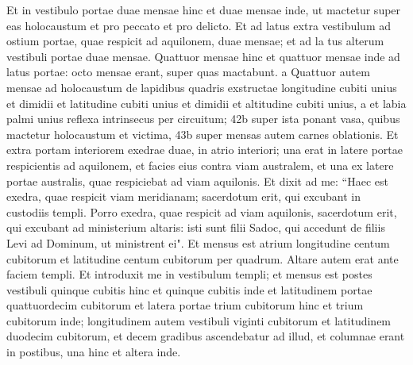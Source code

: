 \begin{biblechapter}
\verse Et in vestibulo portae duae mensae hinc et duae mensae inde, ut mactetur super eas holocaustum et pro peccato et pro delicto. 
\verse Et ad latus extra vestibulum ad ostium portae, quae respicit ad aquilonem, duae mensae; et ad la tus alterum vestibuli portae duae mensae. 
\verse Quattuor mensae hinc et quattuor mensae inde ad latus portae: octo mensae erant, super quas mactabunt.  
\verse a Quattuor autem mensae ad holocaustum de lapidibus quadris exstructae longitudine cubiti unius et dimidii et latitudine cubiti unius et dimidii et altitudine cubiti unius, 
\verse a et labia palmi unius reflexa intrinsecus per circuitum; 42b super ista ponant vasa, quibus mactetur holocaustum et victima,  43b super mensas autem carnes oblationis. 
\verse Et extra portam interiorem exedrae duae, in atrio interiori; una erat in latere portae respicientis ad aquilonem, et facies eius contra viam australem, et una ex latere portae australis, quae respiciebat ad viam aquilonis. 
\verse Et dixit ad me: “Haec est exedra, quae respicit viam meridianam; sacerdotum erit, qui excubant in custodiis templi. 
\verse Porro exedra, quae respicit ad viam aquilonis, sacerdotum erit, qui excubant ad ministerium altaris: isti sunt filii Sadoc, qui accedunt de filiis Levi ad Dominum, ut ministrent ei". 
\verse Et mensus est atrium longitudine centum cubitorum et latitudine centum cubitorum per quadrum. Altare autem erat ante faciem templi. 
\verse Et introduxit me in vestibulum templi; et mensus est postes vestibuli quinque cubitis hinc et quinque cubitis inde et latitudinem portae quattuordecim cubitorum et latera portae trium cubitorum hinc et trium cubitorum inde; 
\verse longitudinem autem vestibuli viginti cubitorum et latitudinem duodecim cubitorum, et decem gradibus ascendebatur ad illud, et columnae erant in postibus, una hinc et altera inde. 
\end{biblechapter}

